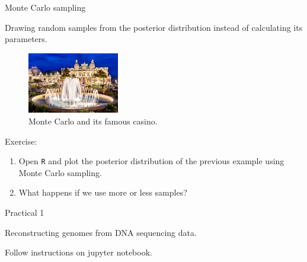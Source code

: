 \begin{frame}{Monte Carlo sampling}

	Drawing random samples from the posterior distribution instead of calculating its parameters.

	\begin{figure}[!ht]
		\centering
		\includegraphics[width=4cm]{Images/MonteCarlo.jpeg}
		\caption{Monte Carlo and its famous casino.}
		\label{Fig:MonteCarlo}
	\end{figure}

	Exercise:\\
	\begin{enumerate}
		\item Open \texttt{R} and plot the posterior distribution of the previous example 
		using Monte Carlo sampling.
		\item What happens if we use more or less samples?
	\end{enumerate}

\end{frame}

\begin{frame}{Practical 1}

	Reconstructing genomes from DNA sequencing data.

	Follow instructions on jupyter notebook.

\end{frame}



